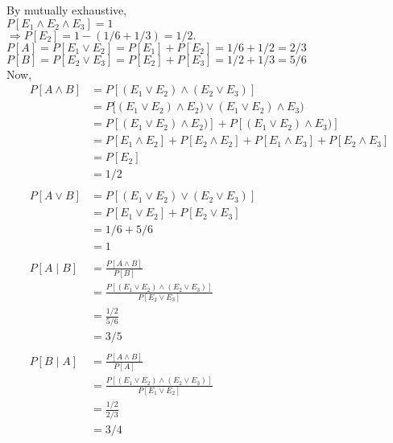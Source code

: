 \documentclass[
  12pt,
]{article}
\begin{document}
\begin{enumerate}
{By mutually exhaustive,\\
$P[ E_1 \wedge E_2 \wedge E_3] = 1$\\
$\Rightarrow P[ E_2] = 1-(1/6+1/3) = 1/2.$\\
$P[A] = P[E_1 \vee E_2] = P[E_1] + P[E_2] = 1/6 +1/2 = 2/3$\\
$P[B] = P[E_2 \vee E_3] = P[E_2] + P[E_3] = 1/2+1/3 = 5/6$\\
Now,
$$\begin{aligned}
P[A \wedge B] &= P[(E_1 \vee E_2) \wedge (E_2\vee E_3)]\\
&= P[(E_1 \vee E_2) \wedge E_2) \vee (E_1 \vee E_2) \wedge E_3)\\
&= P[(E_1 \vee E_2) \wedge E_2)] + P[(E_1 \vee E_2) \wedge E_3)]\\
&= P[E_1 \wedge E_2] + P[E_2 \wedge E_2] + P[E_1 \wedge E_3] + P[E_2 \wedge E_3]\\
&= P[E_2]\\
&= 1/2\\
\\
P[A\vee B] &= P[(E_1 \vee E_2) \vee (E_2\vee E_3)]\\
&= P[E_1 \vee E_2] + P[E_2 \vee E_3]\\
&= 1/6 + 5/6\\
&= 1\\
\\
P[A\mid B] &= \frac{P[A \wedge B]}{P[B]}\\
&= \frac{P[(E_1 \vee E_2) \wedge (E_2\vee E_3)]}{P[E_2\vee E_3]}\\
&= \frac{1/2}{5/6}\\
&= 3/5\\
\\
P[B\mid A] &= \frac{P[A \wedge B]}{P[A]}\\
&= \frac{P[(E_1 \vee E_2) \wedge (E_2\vee E_3)]}{P[E_1\vee E_2]}\\
&= \frac{1/2}{2/3}\\
&= 3/4
\end{aligned}$$
}


\end{enumerate}
\end{document}
